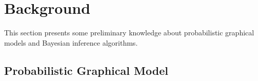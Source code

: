 \section{Background}
\label{sec:background}
This section presents some preliminary knowledge about probabilistic graphical
models and Bayesian inference algorithms.
  
%
%
%
%
%
%
%

\subsection{Probabilistic Graphical Model}

